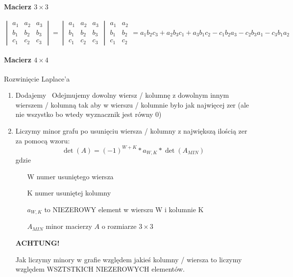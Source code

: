 \paragraph{Macierz $3\times 3$}
$$\begin{vmatrix}
a_1&a_2&a_3\\
b_1&b_2&b_3\\
c_1&c_2&c_3
\end{vmatrix}=\begin{vmatrix}
a_1&a_2&a_3\\
b_1&b_2&b_3\\
c_1&c_2&c_3
\end{vmatrix}\begin{matrix}
a_1&a_2\\
b_1&b_2\\
c_1&c_2
\end{matrix}=a_1b_2c_3+a_2b_3c_1+a_3b_1c_2-c_1b_2a_3-c_2b_3a_1-c_3b_1a_2$$

\paragraph{Macierz $4\times 4$}
Rozwinięcie Laplace'a
\begin{enumerate}
\item Dodajemy \ Odejmujemy dowolny wiersz / kolumnę z dowolnym innym wierszem / kolumną tak aby w wierszu / kolumnie było jak najwięcej zer (ale nie wszystko bo wtedy wyznacznik jest równy 0)
\item Liczymy minor grafu po usunięciu wiersza / kolumny z największą ilością zer za pomocą wzoru:
$$\det (A)=(-1)^{W+K}*a_{W,K}*\det (A_{MIN})$$ gdzie 
\begin{itemize}
\item[W] numer usuniętego wiersza 
\item[K] numer usuniętej kolumny
\item[$a_{W,K}$] to NIEZEROWY element w wierszu W i kolumnie K
\item[$A_{MIN}$] minor macierzy $A$ o rozmiarze $3\times 3$ 
\end{itemize}
\textbf{ACHTUNG!}

Jak liczymy minory w grafie względem jakieś kolumny / wiersza to liczymy względem WSZTSTKICH NIEZEROWYCH elementów.
\end{enumerate}

